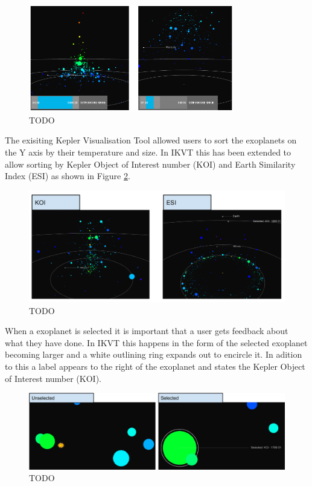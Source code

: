 \begin{figure}[H]
  \centering
      \includegraphics[width=0.8\textwidth]{images/zoomFilter.png}
  \caption{TODO~}  
    \label{fig:zoomFilter}
\end{figure}

The exisiting Kepler Visualisation Tool allowed users to sort the exoplanets on
the Y axis by their temperature and size. In IKVT this has been extended to
allow sorting by Kepler Object of Interest number (KOI) and Earth Similarity
Index (ESI) as shown in Figure \ref{fig:ESIKOI}.


\begin{figure}[H]
  \centering
      \includegraphics[width=1\textwidth]{images/ESIKOI.pdf}
  \caption{TODO~}  
    \label{fig:ESIKOI}
\end{figure}

When a exoplanet is selected it is important that a user gets feedback about
what they have done. In IKVT this happens in the form of the selected exoplanet
becoming larger and a white outlining ring expands out to encircle it. In
adition to this a label appears to the right of the exoplanet and states the
Kepler Object of Interest number (KOI). 

\begin{figure}[H]
  \centering
      \includegraphics[width=1\textwidth]{images/selectedPlanet.jpg}
  \caption{TODO~}  
    \label{fig:selectedPlanet}
\end{figure}

